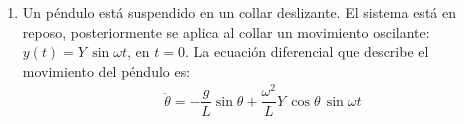 \begin{enumerate}
\item Un péndulo está suspendido en un collar deslizante. El sistema está en reposo, posteriormente se aplica al collar un movimiento oscilante: $y (t) = Y \, \sin \omega t$, en $t = 0$. La ecuación diferencial que describe el movimiento del péndulo es:
\begin{align*}
\ddot{\theta} = - \dfrac{g}{L} \sin \theta + \dfrac{\omega^{2}}{L} Y \, \cos \theta \, \sin \omega t
\end{align*}


\end{enumerate}
